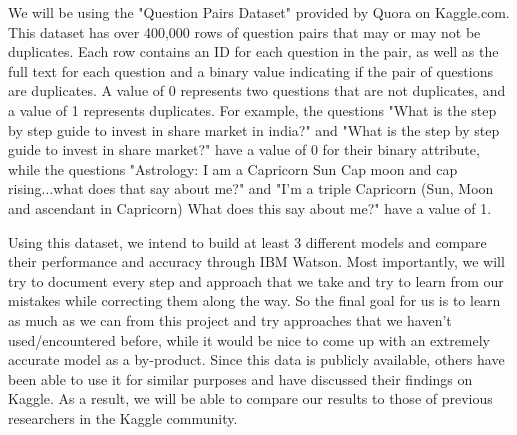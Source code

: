 \documentclass{sig-alternate}
\begin{document}
We will be using the "Question Pairs Dataset" provided by Quora on Kaggle.com.\cite{quora:kaggle} This dataset has over 400,000 rows of question pairs that may or may not be duplicates. Each row contains an ID for each question in the pair, as well as the full text for each question and a binary value indicating if the pair of questions are duplicates. A value of 0 represents two questions that are not duplicates, and a value of 1 represents duplicates. For example, the questions "What is the step by step guide to invest in share market in india?" and "What is the step by step guide to invest in share market?" have a value of 0 for their binary attribute, while the questions "Astrology: I am a Capricorn Sun Cap moon and cap rising...what does that say about me?" and "I'm a triple Capricorn (Sun, Moon and ascendant in Capricorn) What does this say about me?" have a value of 1.

Using this dataset, we intend to build at least 3 different models and compare their performance and accuracy through IBM Watson. Most importantly, we will try to document every step and approach that we take and try to learn from our mistakes while correcting them along the way. So the final goal for us is to learn as much as we can from this project and try approaches that we haven't used/encountered before, while it would be nice to come up with an extremely accurate model as a by-product. Since this data is publicly available, others have been able to use it for similar purposes and have discussed their findings on Kaggle. As a result, we will be able to compare our results to those of previous researchers in the Kaggle community.



\balance
\end{document}
